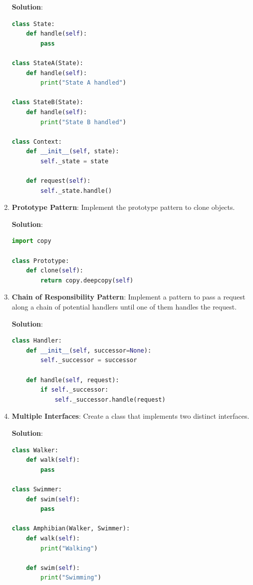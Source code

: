 \documentclass[12pt]{book}
\begin{document}
\begin{enumerate}
    \textbf{Solution}:
    \begin{lstlisting}[language=Python]
class State:
    def handle(self):
        pass

class StateA(State):
    def handle(self):
        print("State A handled")

class StateB(State):
    def handle(self):
        print("State B handled")

class Context:
    def __init__(self, state):
        self._state = state

    def request(self):
        self._state.handle()
    \end{lstlisting}

    \item \textbf{Prototype Pattern}: Implement the prototype pattern to clone objects.

    \textbf{Solution}:
    \begin{lstlisting}[language=Python]
import copy

class Prototype:
    def clone(self):
        return copy.deepcopy(self)
    \end{lstlisting}

    \item \textbf{Chain of Responsibility Pattern}: Implement a pattern to pass a request along a chain of potential handlers until one of them handles the request.

    \textbf{Solution}:
    \begin{lstlisting}[language=Python]
class Handler:
    def __init__(self, successor=None):
        self._successor = successor

    def handle(self, request):
        if self._successor:
            self._successor.handle(request)
    \end{lstlisting}

    \item \textbf{Multiple Interfaces}: Create a class that implements two distinct interfaces.

    \textbf{Solution}:
    \begin{lstlisting}[language=Python]
class Walker:
    def walk(self):
        pass

class Swimmer:
    def swim(self):
        pass

class Amphibian(Walker, Swimmer):
    def walk(self):
        print("Walking")

    def swim(self):
        print("Swimming")
    \end{lstlisting}


\end{enumerate}
\end{document}
